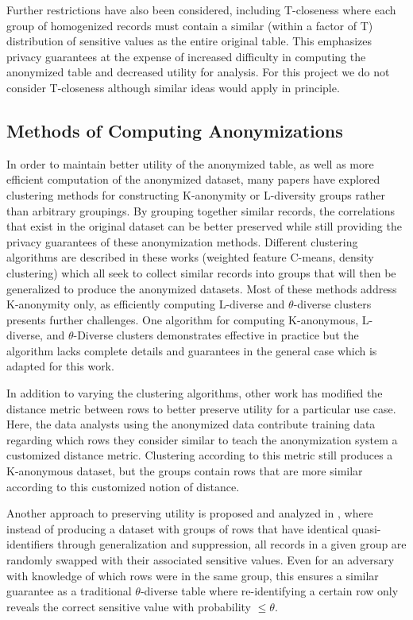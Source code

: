 Further restrictions have also been considered, including T-closeness\cite{litCloseness} where each group of homogenized records must contain a similar (within a factor of T) distribution of sensitive values as the entire original table. This emphasizes privacy guarantees at the expense of increased difficulty in computing the anonymized table and decreased utility for analysis. For this project we do not consider T-closeness although similar ideas would apply in principle.

\subsection{Methods of Computing Anonymizations}
In order to maintain better utility of the anonymized table, as well as more efficient computation of the anonymized dataset, many papers have explored clustering methods for constructing K-anonymity or L-diversity groups rather than arbitrary groupings. By grouping together similar records, the correlations that exist in the original dataset can be better preserved while still providing the privacy guarantees of these anonymization methods\cite{niClustering}\cite{liuDensity}\cite{chiuClustering}. Different clustering algorithms are described in these works (weighted feature C-means, density clustering) which all seek to collect similar records into groups that will then be generalized to produce the anonymized datasets. Most of these methods address K-anonymity only, as efficiently computing L-diverse and $\theta$-diverse clusters presents further challenges. One algorithm for computing K-anonymous, L-diverse, and $\theta$-Diverse clusters demonstrates effective in practice but the algorithm lacks complete details and guarantees in the general case \cite{yangEnhanced} which is adapted for this work.

In addition to varying the clustering algorithms, other work has modified the distance metric between rows to better preserve utility for a particular use case\cite{jiaPad}. Here, the data analysts using the anonymized data contribute training data regarding which rows they consider similar to teach the anonymization system a customized distance metric. Clustering according to this metric still produces a K-anonymous dataset, but the groups contain rows that are more similar according to this customized notion of distance.

Another approach to preserving utility is proposed and analyzed in \cite{soriaSwapping}, where instead of producing a dataset with groups of rows that have identical quasi-identifiers through generalization and suppression, all records in a given group are randomly swapped with their associated sensitive values. Even for an adversary with knowledge of which rows were in the same group, this ensures a similar guarantee as a traditional $\theta$-diverse table where re-identifying a certain row only reveals the correct sensitive value with probability $\leq\theta$. 

